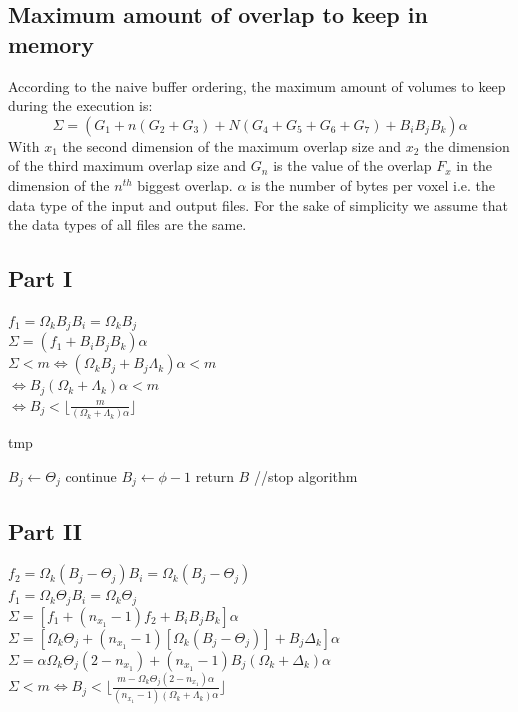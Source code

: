 \documentclass[conference]{IEEEtran}
\begin{document}
  \subsection{Maximum amount of overlap to keep in memory}
  According to the naive buffer ordering, the maximum amount of volumes to keep during the execution is:
  $$\Sigma = (G_1 + n(G_2 + G_3) + N(G_4 + G_5 + G_6 + G_7) + B_iB_jB_k)\alpha$$
  With $x_1$ the second dimension of the maximum overlap size and $x_2$ the dimension of the third maximum overlap size and $G_n$ is the value of the overlap $F_x$ in the dimension of the $n^{th}$ biggest overlap.
  $\alpha$ is the number of bytes per voxel i.e. the data type of the input and output files.
  For the sake of simplicity we assume that the data types of all files are the same.

  \subsection{Part I}
  \noindent $f_1 = \Omega_k B_j B_i = \Omega_k B_j$ \\
  $\Sigma = (f_1 + B_iB_jB_k)\alpha$ \\
  $\Sigma < m \Leftrightarrow (\Omega_k B_j + B_j \Lambda_k)\alpha < m$ \\
  $\Leftrightarrow B_j (\Omega_k + \Lambda_k) \alpha < m $ \\
  $\Leftrightarrow B_j < \lfloor \frac{m}{(\Omega_k + \Lambda_k)\alpha} \rfloor$

  \begin{algorithm}[h]
    \caption{tmp}
    \begin{algorithmic}[1]
      \STATE $B_j \leftarrow \Theta_j$
      \STATE continue
    \ELSE
      \STATE $B_j \leftarrow \phi - 1$
      \STATE return $B$ //stop algorithm
    \ENDIF
    \end{algorithmic}
  \end{algorithm}

  \subsection{Part II}
  \noindent $f_2 = \Omega_k (B_j - \Theta_j)B_i = \Omega_k(B_j - \Theta_j)$ \\
  $f_1 = \Omega_k\Theta_jB_i = \Omega_k\Theta_j $ \\
  $\Sigma = [f_1 + (n_{x_1} - 1)f_2 + B_iB_jB_k]\alpha$ \\
  $\Sigma = [\Omega_k\Theta_j + (n_{x_1}-1)[\Omega_k(B_j -\Theta_j)] + B_j\Delta_k]\alpha$ \\
  $\Sigma = \alpha\Omega_k\Theta_j(2-n_{x_1})+(n_{x_1}-1)B_j(\Omega_k+\Delta_k)\alpha$ \\
  $\Sigma < m \Leftrightarrow B_j < \lfloor \frac{m - \Omega_k\Theta_j(2-n_{x_1})\alpha}{(n_{x_1}-1)(\Omega_k+\Lambda_k)\alpha} \rfloor $
\end{document}
